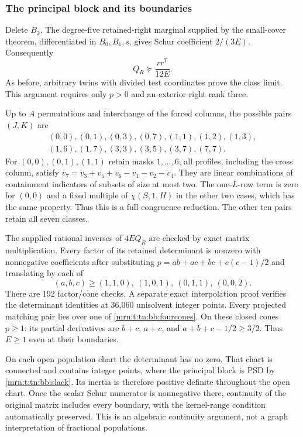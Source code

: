 \documentclass[11pt,a4paper]{article}
\theoremstyle{remark}\newtheorem{remark}[theorem]{Remark}
\newcommand{\PSD}{\succeq}                 %
\begin{document}
\subsubsection{The principal block and its boundaries}
Delete $B_2$. The degree-five retained-right marginal supplied by the
small-cover theorem, differentiated in $B_0,B_1,s$, gives Schur coefficient
$2/(3E)$. Consequently
\begin{equation}\label{mrn:t:tn:bb:slack}
 Q_R\PSD\frac{rr^{\mathsf T}}{12E}.
\end{equation}
As before, arbitrary twins with divided test coordinates prove the class
limit. This argument requires only $p>0$ and an exterior right rank three.

Up to $A$ permutations and interchange of the forced columns, the possible
pairs $(J,K)$ are
\[
\begin{gathered}
(0,0),(0,1),(0,3),(0,7),(1,1),(1,2),(1,3),\\
(1,6),(1,7),(3,3),(3,5),(3,7),(7,7).
\end{gathered}
\]
For $(0,0),(0,1),(1,1)$ retain masks $1,\ldots,6$; all profiles, including
the cross column, satisfy
$v_7=v_3+v_5+v_6-v_1-v_2-v_4$.
They are linear combinations of containment indicators of subsets of
size at most two. The one-$L$-row term is zero for $(0,0)$ and a fixed
multiple of $\chi(S,1,H)$ in the other two cases, which has the same
property. Thus this is a full congruence reduction. The other ten pairs
retain all seven classes.

The supplied rational inverses of $4E Q_R$ are checked by exact matrix
multiplication. Every factor of its retained determinant is nonzero with
nonnegative coefficients after substituting $p=ab+ac+bc+c(c-1)/2$ and
translating by each of
\begin{equation}\label{mrn:t:tn:bb:fourcones}
 (a,b,c)\ge(1,1,0),\ (1,0,1),\ (0,1,1),\ (0,0,2).
\end{equation}
There are 192 factor/cone checks. A separate exact interpolation proof
verifies the determinant identities at 36,060 unisolvent integer points.
Every projected matching pair lies over one of \eqref{mrn:t:tn:bb:fourcones}.
On these closed cones $p\ge1$: its partial derivatives are $b+c$, $a+c$,
and $a+b+c-1/2\ge3/2$. Thus $E\ge1$ even at their boundaries.

On each open population chart the determinant has no zero. That chart is
connected and contains integer points, where the principal block is PSD
by \eqref{mrn:t:tn:bb:slack}. Its inertia is therefore positive definite throughout
the open chart. Once the scalar Schur numerator is nonnegative there,
continuity of the original matrix includes every boundary, with the
kernel-range condition automatically preserved. This is an algebraic
continuity argument, not a graph interpretation of fractional populations.
\end{document}
